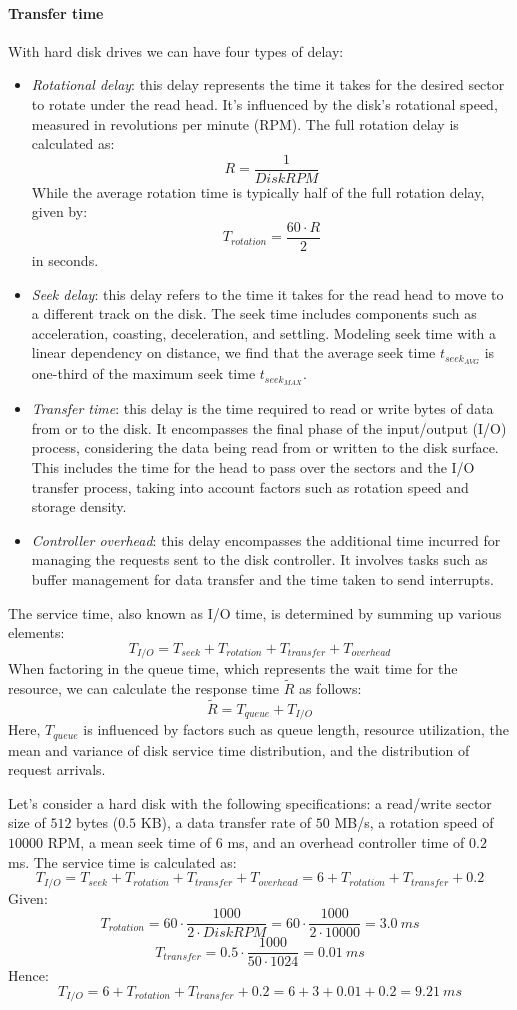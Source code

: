 \paragraph*{Transfer time}
With hard disk drives we can have four types of delay: 
\begin{itemize}
    \item \textit{Rotational delay}: this delay represents the time it takes for the desired sector to rotate under the read head. 
        It's influenced by the disk's rotational speed, measured in revolutions per minute (RPM).
        The full rotation delay is calculated as: 
        \[R=\dfrac{1}{DiskRPM}\]
        While the average rotation time is typically half of the full rotation delay, given by: 
        \[T_{rotation}=\dfrac{60\cdot R}{2}\]
        in seconds.
    \item \textit{Seek delay}: this delay refers to the time it takes for the read head to move to a different track on the disk. 
        The seek time includes components such as acceleration, coasting, deceleration, and settling. 
        Modeling seek time with a linear dependency on distance, we find that the average seek time $t_{seek_{AVG}}$ is one-third of the maximum seek time $t_{seek_{MAX}}$. 
    \item \textit{Transfer time}: this delay is the time required to read or write bytes of data from or to the disk. 
        It encompasses the final phase of the input/output (I/O) process, considering the data being read from or written to the disk surface. 
        This includes the time for the head to pass over the sectors and the I/O transfer process, taking into account factors such as rotation speed and storage density.
    \item \textit{Controller overhead}: this delay encompasses the additional time incurred for managing the requests sent to the disk controller.
        It involves tasks such as buffer management for data transfer and the time taken to send interrupts.
\end{itemize}
The service time, also known as I/O time, is determined by summing up various elements:
\[T_{I/O}=T_{seek}+T_{rotation}+T_{transfer}+T_{overhead}\]
When factoring in the queue time, which represents the wait time for the resource, we can calculate the response time $\tilde{R}$ as follows:
\[\tilde{R}=T_{queue}+T_{I/O}\]
Here, $T_{queue}$ is influenced by factors such as queue length, resource utilization, the mean and variance of disk service time distribution, and the distribution of request arrivals.
\begin{example}
    Let's consider a hard disk with the following specifications: a read/write sector size of $512$ bytes ($0.5$ KB), a data transfer rate of $50$ MB/s, a rotation speed of $10000$ RPM, a mean seek time of $6$ ms, and an overhead controller time of $0.2$ ms.
    The service time is calculated as:
    \[T_{I/O}=T_{seek}+T_{rotation}+T_{transfer}+T_{overhead}=6+T_{rotation}+T_{transfer}+0.2\]
    Given:
    \[T_{rotation}=60\cdot\dfrac{1000}{2 \cdot DiskRPM}=60\cdot\dfrac{1000}{2 \cdot 10000}=3.0\:ms\]
    \[T_{transfer}=0.5\cdot\dfrac{1000}{50 \cdot 1024}=0.01\:ms\]
    Hence:
    \[T_{I/O}=6+T_{rotation}+T_{transfer}+0.2=6+3+0.01+0.2=9.21\:ms\]
\end{example}
